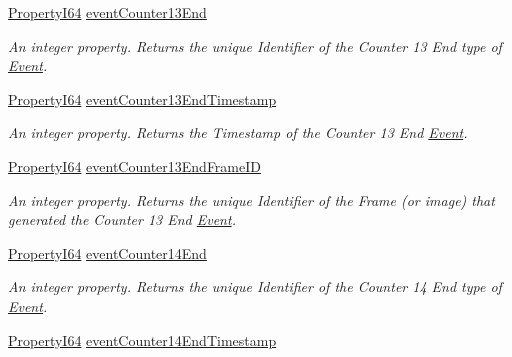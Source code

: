 \begin{DoxyCompactItemize}
\hyperlink{group___common_interface_ga81749b2696755513663492664a18a893}{Property\+I64} \hyperlink{classmv_i_m_p_a_c_t_1_1acquire_1_1_gen_i_cam_1_1_event_control_a2185b2529e146ab7edc841afb39b63e3}{event\+Counter13\+End}
\begin{DoxyCompactList}\small\item\em An integer property. Returns the unique Identifier of the Counter 13 End type of \hyperlink{classmv_i_m_p_a_c_t_1_1acquire_1_1_event}{Event}. \end{DoxyCompactList}\item 
\hyperlink{group___common_interface_ga81749b2696755513663492664a18a893}{Property\+I64} \hyperlink{classmv_i_m_p_a_c_t_1_1acquire_1_1_gen_i_cam_1_1_event_control_ae6d4ef51144663c001ae3a8ab83f0850}{event\+Counter13\+End\+Timestamp}
\begin{DoxyCompactList}\small\item\em An integer property. Returns the Timestamp of the Counter 13 End \hyperlink{classmv_i_m_p_a_c_t_1_1acquire_1_1_event}{Event}. \end{DoxyCompactList}\item 
\hyperlink{group___common_interface_ga81749b2696755513663492664a18a893}{Property\+I64} \hyperlink{classmv_i_m_p_a_c_t_1_1acquire_1_1_gen_i_cam_1_1_event_control_abc5a960c7b5993b2dcd8740cce93bf6f}{event\+Counter13\+End\+Frame\+I\+D}
\begin{DoxyCompactList}\small\item\em An integer property. Returns the unique Identifier of the Frame (or image) that generated the Counter 13 End \hyperlink{classmv_i_m_p_a_c_t_1_1acquire_1_1_event}{Event}. \end{DoxyCompactList}\item 
\hyperlink{group___common_interface_ga81749b2696755513663492664a18a893}{Property\+I64} \hyperlink{classmv_i_m_p_a_c_t_1_1acquire_1_1_gen_i_cam_1_1_event_control_a221547b93f72d8cf3801b3ed0a60d08d}{event\+Counter14\+End}
\begin{DoxyCompactList}\small\item\em An integer property. Returns the unique Identifier of the Counter 14 End type of \hyperlink{classmv_i_m_p_a_c_t_1_1acquire_1_1_event}{Event}. \end{DoxyCompactList}\item 
\hyperlink{group___common_interface_ga81749b2696755513663492664a18a893}{Property\+I64} \hyperlink{classmv_i_m_p_a_c_t_1_1acquire_1_1_gen_i_cam_1_1_event_control_a880e92a1733c2676fed0ae73aab241b5}{event\+Counter14\+End\+Timestamp}

\end{DoxyCompactItemize}
